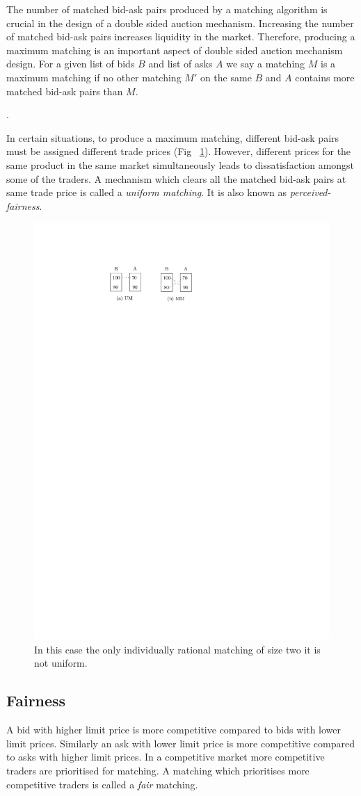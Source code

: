 \documentclass[a4paper,UKenglish,cleveref, autoref]{lipics-v2019}
\begin{document}
The number of matched bid-ask pairs produced by a matching algorithm is crucial in the design of a double sided auction mechanism. Increasing the number of matched bid-ask pairs increases  liquidity in the market. Therefore, producing a maximum matching is an important aspect of double sided auction mechanism design. For a given list of bids $B$ and list of asks $A$ we say a matching $M$ is  a maximum matching if no other matching $M'$ on the same $B$ and $A$ contains more matched bid-ask pairs than $M$. 

\begin{definition}
.
\end{definition}

In certain situations, to produce a maximum matching, different bid-ask pairs must be assigned different trade prices (Fig ~\ref{fig:mmum}).  However, different prices for the same product in the same market simultaneously leads to dissatisfaction amongst some of the traders. A mechanism which clears all the matched bid-ask pairs at same trade price is called a \emph{uniform matching}. It is also known as \emph{perceived-fairness}. 

\begin{figure}[h!]
\centering
\includegraphics[width=.35\textwidth]{mm_um.pdf}
\caption{In this case the only individually rational matching of size two it is not uniform.}
\label{fig:mmum}
\end{figure}

\subsection{Fairness}  

A bid with higher limit price is more competitive compared to bids with lower limit prices. Similarly an ask with lower limit price is more competitive compared to asks with higher limit prices. In a competitive market more competitive traders are prioritised for matching. A matching which prioritises more competitive traders is called a \emph{fair} matching. 
\end{document}
